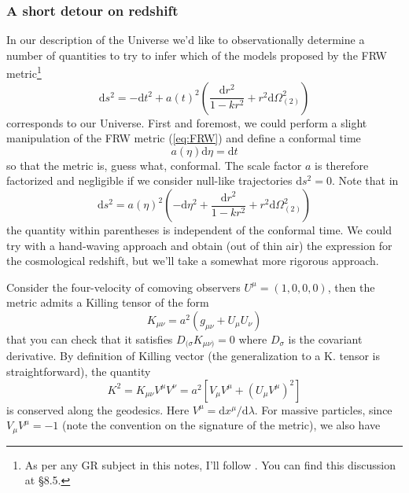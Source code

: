\subsubsection{A short detour on redshift}
In our description of the Universe we'd like to observationally determine a number of quantities to try to infer which of the models proposed by the FRW metric\footnote{As per any GR subject in this notes, I'll follow \cite{carroll}. You can find this discussion at §8.5.}
\begin{equation}
    \text{d}s^{2} = -\text{d}t^{2}+a(t)^{2}\left(\frac{\text{d}r^{2}}{1-kr^{2}}+r^{2}\text{d}\Omega_{(2)}^{2}\right)
    \label{eq:FRW}
\end{equation}
corresponds to our Universe. First and foremost, we could perform a slight manipulation of the FRW metric (\ref{eq:FRW}) and define a conformal time 
\begin{equation*}
    a(\eta)\text{d}\eta = \text{d}t
\end{equation*}
so that the metric is, guess what, conformal. The scale factor $a$ is therefore factorized and negligible if we consider null-like trajectories $\text{d}s^{2} = 0$. Note that in 
\begin{equation}
    \text{d}s^{2} = a(\eta)^{2}\left(-\text{d}\eta^{2}+\frac{\text{d}r^{2}}{1-kr^{2}}+r^{2}\text{d}\Omega_{(2)}^{2}\right)
    \label{eq:FRW_conf}
\end{equation}
the quantity within parentheses is independent of the conformal time. We could try with a hand-waving approach and obtain (out of thin air) the expression for the cosmological redshift, but we'll take a somewhat more rigorous approach.
\par Consider the four-velocity of comoving observers $U^{\mu} = (1,0,0,0)$, then the metric admits a Killing tensor of the form 
\begin{equation*}
    K_{\mu\nu} = a^{2}(g_{\mu\nu}+U_{\mu}U_{\nu})
\end{equation*}
that you can check that it satisfies $D_{(\sigma}K_{\mu\nu)} = 0$ where $D_{\sigma}$ is the covariant derivative. By definition of Killing vector (the generalization to a K. tensor is straightforward), the quantity 
\begin{equation}
    K^{2} = K_{\mu\nu}V^{\mu}V^{\nu} = a^{2}\left[V_{\mu}V^{\mu}+(U_{\mu}V^{\mu})^{2}\right]
    \label{eq:conserved_killing}
\end{equation}
is conserved along the geodesics. Here $V^{\mu} = \text{d}x^{\mu}/\text{d}\lambda$. For massive particles, since $V_{\mu}V^{\mu} = -1$ (note the convention on the signature of the metric), we also have
